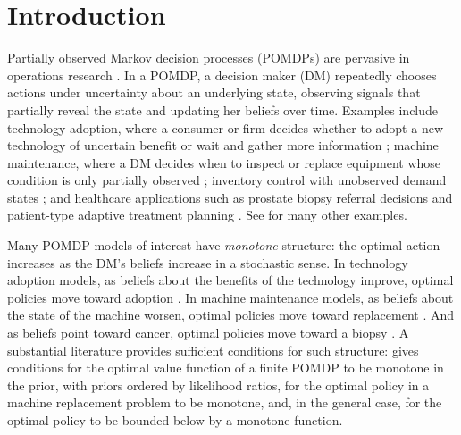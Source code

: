 \section{Introduction}\label{sec:intro}

Partially observed Markov decision processes (POMDPs) are pervasive in
operations research \citep{krishnamurthy2016partially}. In a POMDP, a
decision maker (DM) repeatedly chooses actions under uncertainty about
an underlying state, observing signals that partially reveal the state
and updating her beliefs over time. Examples include technology
adoption, where a consumer or firm decides whether to adopt a new
technology of uncertain benefit or wait and gather more information
\citep{mccardle1985information, lippman1987does, ulu2009uncertainty};
machine maintenance, where a DM decides when to inspect or replace
equipment whose condition is only partially observed
\citep{white1979optimal, maillart2006maintenance}; inventory control
with unobserved demand states \citep{treharne2002adaptive}; and
healthcare applications such as prostate biopsy referral decisions
\citep{zhang2012optimization} and patient-type adaptive treatment
planning \citep{skandari2021patient}. See
\citet{krishnamurthy2016partially} for many other examples.

Many POMDP models of interest have \emph{monotone} structure: the
optimal action increases as the DM's beliefs increase in a stochastic
sense. In technology adoption models, as beliefs about the benefits of
the technology improve, optimal policies move toward adoption
\citep{mccardle1985information, ulu2009uncertainty}. In machine
maintenance models, as beliefs about the state of the machine worsen,
optimal policies move toward replacement \citep{white1979optimal,
lovejoy1987some}. And as beliefs point toward cancer, optimal policies
move toward a biopsy \citep{zhang2012optimization}. A substantial
literature provides sufficient conditions for such structure:
\citet{lovejoy1987some} gives conditions for the optimal value
function of a finite POMDP to be monotone in the prior, with priors
ordered by likelihood ratios, for the optimal policy in a machine
replacement problem to be monotone, and, in the general case, for the
optimal policy to be bounded below by a monotone function.

